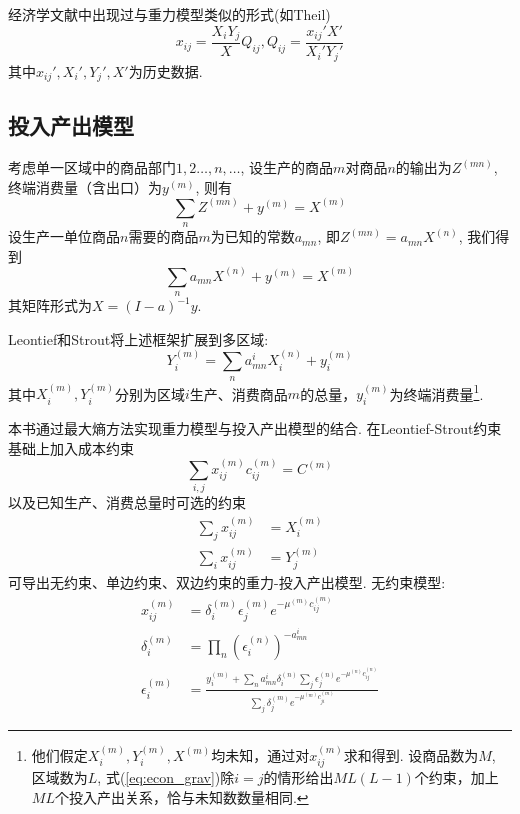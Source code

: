 \par 经济学文献中出现过与重力模型类似的形式(如Theil)
\begin{equation}
    x_{ij}=\frac{X_iY_j}{X} Q_{ij}, Q_{ij}=\frac{x_{ij}' X'}{X_i'Y_j'}
    \label{eq:econ_grav}
\end{equation}
其中$x_{ij}', X_i', Y_j', X'$为历史数据. 

\subsection{投入产出模型}

\par 考虑单一区域中的商品部门$1,2\dots,n,\dots$, 设生产的商品$m$对商品$n$的输出为$Z^{(mn)}$, 终端消费量（含出口）为$y^{(m)}$, 则有
\begin{equation}
    \sum_n Z^{(mn)}+y^{(m)}=X^{(m)}
\end{equation}
设生产一单位商品$n$需要的商品$m$为已知的常数$a_{mn}$, 即$Z^{(mn)}=a_{mn}X^{(n)}$, 我们得到
\begin{equation}
    \sum_n a_{mn}X^{(n)}+y^{(m)}=X^{(m)}
\end{equation}
其矩阵形式为$X=(I-a)^{-1}y$. 
\par Leontief和Strout将上述框架扩展到多区域:
\begin{equation}
    Y_i^{(m)}=\sum_n a_{mn}^{i} X_i^{(n)}+y_i^{(m)}
\end{equation}
其中$X_i^{(m)}, Y_i^{(m)}$分别为区域$i$生产、消费商品$m$的总量，$y_i^{(m)}$为终端消费量\footnote{他们假定$X_i^{(m)}, Y_i^{(m)}, X^{(m)}$均未知，通过对$x_{ij}^{(m)}$求和得到. 设商品数为$M$, 区域数为$L$, 式(\ref{eq:econ_grav})除$i=j$的情形给出$ML(L-1)$个约束，加上$ML$个投入产出关系，恰与未知数数量相同. }. 
\par 本书通过最大熵方法实现重力模型与投入产出模型的结合. 在Leontief-Strout约束基础上加入成本约束
\begin{equation}
\sum_{i,j} x_{ij}^{(m)} c_{ij}^{(m)}=C^{(m)}
\end{equation}
以及已知生产、消费总量时可选的约束
\begin{align}
    \sum_j x_{ij}^{(m)} &= X_i^{(m)}\\
    \sum_i x_{ij}^{(m)} &= Y_j^{(m)}
\end{align}
可导出无约束、单边约束、双边约束的重力-投入产出模型. 无约束模型: 
\begin{align}
x_{ij}^{(m)}&=\delta_i^{(m)} \epsilon_j^{(m)} e^{-\mu^{(m)} c_{ij}^{(m)}}\\
\delta_i^{(m)}&=\prod_n \left(\epsilon_i^{(n)}\right)^{-a_{mn}^{i}}\\
\epsilon_i^{(m)}&=\frac{y_i^{(m)}+\sum_n a_{mn}^i \delta_i^{(n)} \sum_j \epsilon_j^{(n)}e^{-\mu^{(n)}c_{ij}^{(n)}}}{\sum_j \delta_j^{(m)} e^{-\mu^{(m)}c_{ji}^{(m)}}}
\end{align}
